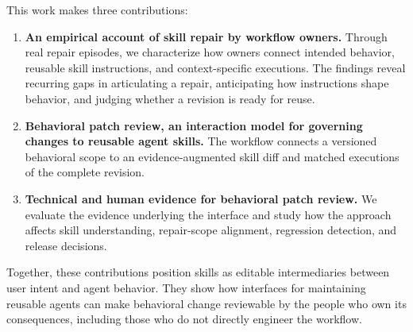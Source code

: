This work makes three contributions:
\begin{enumerate}
    \item \textbf{An empirical account of skill repair by workflow owners.} Through real repair episodes, we characterize how owners connect intended behavior, reusable skill instructions, and context-specific executions. The findings reveal recurring gaps in articulating a repair, anticipating how instructions shape behavior, and judging whether a revision is ready for reuse.
    \item \textbf{Behavioral patch review, an interaction model for governing changes to reusable agent skills.} The workflow connects a versioned behavioral scope to an evidence-augmented skill diff and matched executions of the complete revision.
    \item \textbf{Technical and human evidence for behavioral patch review.} We evaluate the evidence underlying the interface and study how the approach affects skill understanding, repair-scope alignment, regression detection, and release decisions.
\end{enumerate}

Together, these contributions position skills as editable intermediaries between user intent and agent behavior. They show how interfaces for maintaining reusable agents can make behavioral change reviewable by the people who own its consequences, including those who do not directly engineer the workflow.
